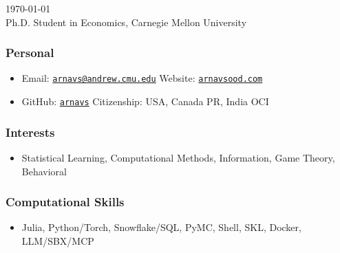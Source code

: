 \documentclass[12pt]{article}   %
\begin{document}
\nocite{NBERw28981}
\nocite{FP}
\nocite{WDW}

\renewcommand{\labelitemi}{~}

 \hfill \monthyeardate\today \\
\flushleft Ph.D. Student in Economics, Carnegie Mellon University

\subsubsection*{Personal}
\begin{itemize}
  \item Email: \href{mailto:arnavs@andrew.cmu.edu}{\texttt{arnavs@andrew.cmu.edu}} \hfill Website: \href{https://arnavsood.com}{\tt arnavsood.com}
  \item GitHub: \href{https://github.com/arnavs}{\texttt{arnavs}} \hfill Citizenship: USA, Canada PR, India OCI
\end{itemize}

\subsubsection*{Interests}
\begin{itemize}
  \item Statistical Learning, Computational Methods, Information, Game Theory, Behavioral
\end{itemize}

\subsubsection*{Computational Skills}
\begin{itemize}
  \item Julia, Python/Torch, Snowflake/SQL, PyMC, Shell, SKL, Docker, LLM/SBX/MCP
\end{itemize}

\end{document}
